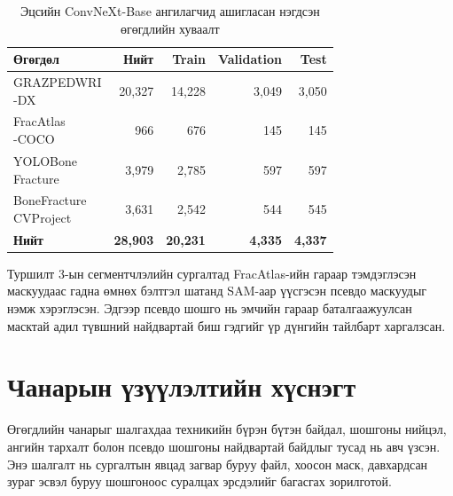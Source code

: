 \begin{table}[H]
    \centering
    \caption{Эцсийн ConvNeXt-Base ангилагчид ашигласан нэгдсэн өгөгдлийн хуваалт}
    \label{tab:v2_combined}
    \small
    \begin{tabular}{p{3.4cm} r r r r}
    \toprule
    \textbf{Өгөгдөл} & \textbf{Нийт} & \textbf{Train} & \textbf{Validation} & \textbf{Test} \\
    \midrule
    \shortstack[l]{GRAZPEDWRI\\-DX} & 20,327 & 14,228 & 3,049 & 3,050 \\
    \shortstack[l]{FracAtlas\\-COCO} & 966 & 676 & 145 & 145 \\
    \shortstack[l]{YOLOBone\\Fracture} & 3,979 & 2,785 & 597 & 597 \\
    \shortstack[l]{BoneFracture\\CVProject} & 3,631 & 2,542 & 544 & 545 \\
    \midrule
    \textbf{Нийт} & \textbf{28,903} & \textbf{20,231} & \textbf{4,335} & \textbf{4,337} \\
    \bottomrule
    \end{tabular}
\end{table}

Туршилт 3-ын сегментчлэлийн сургалтад FracAtlas-ийн гараар тэмдэглэсэн маскуудаас гадна өмнөх бэлтгэл шатанд SAM-аар үүсгэсэн псевдо маскуудыг нэмж хэрэглэсэн. Эдгээр псевдо шошго нь эмчийн гараар баталгаажуулсан масктай адил түвшний найдвартай биш гэдгийг үр дүнгийн тайлбарт харгалзсан.


\section{Чанарын үзүүлэлтийн хүснэгт}

Өгөгдлийн чанарыг шалгахдаа техникийн бүрэн бүтэн байдал, шошгоны нийцэл, ангийн тархалт болон псевдо шошгоны найдвартай байдлыг тусад нь авч үзсэн. Энэ шалгалт нь сургалтын явцад загвар буруу файл, хоосон маск, давхардсан зураг эсвэл буруу шошгоноос суралцах эрсдэлийг багасгах зорилготой.

